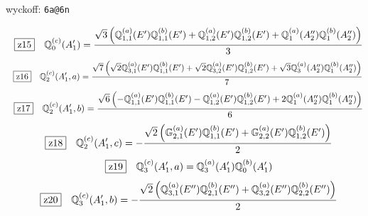 \documentclass[fleqn,10pt,landscape]{jsarticle}
\begin{document}
\noindent\quad * wyckoff: \texttt{6a@6n}

\begin{dmath*}
\hspace*{3mm}\fbox{z15}\quad \mathbb{Q}_{0}^{(c)}(A_{1}^{\prime})=\frac{\sqrt{3} \left(\mathbb{Q}_{1,1}^{(a)}(E^{\prime}) \mathbb{Q}_{1,1}^{(b)}(E^{\prime}) + \mathbb{Q}_{1,2}^{(a)}(E^{\prime}) \mathbb{Q}_{1,2}^{(b)}(E^{\prime}) + \mathbb{Q}_{1}^{(a)}(A_{2}^{\prime\prime}) \mathbb{Q}_{1}^{(b)}(A_{2}^{\prime\prime})\right)}{3}
\end{dmath*}
\begin{dmath*}
\hspace*{3mm}\fbox{z16}\quad \mathbb{Q}_{2}^{(c)}(A_{1}^{\prime},a)=\frac{\sqrt{7} \left(\sqrt{2} \mathbb{Q}_{3,1}^{(a)}(E^{\prime}) \mathbb{Q}_{1,1}^{(b)}(E^{\prime}) + \sqrt{2} \mathbb{Q}_{3,2}^{(a)}(E^{\prime}) \mathbb{Q}_{1,2}^{(b)}(E^{\prime}) + \sqrt{3} \mathbb{Q}_{3}^{(a)}(A_{2}^{\prime\prime}) \mathbb{Q}_{1}^{(b)}(A_{2}^{\prime\prime})\right)}{7}
\end{dmath*}
\begin{dmath*}
\hspace*{3mm}\fbox{z17}\quad \mathbb{Q}_{2}^{(c)}(A_{1}^{\prime},b)=\frac{\sqrt{6} \left(- \mathbb{Q}_{1,1}^{(a)}(E^{\prime}) \mathbb{Q}_{1,1}^{(b)}(E^{\prime}) - \mathbb{Q}_{1,2}^{(a)}(E^{\prime}) \mathbb{Q}_{1,2}^{(b)}(E^{\prime}) + 2 \mathbb{Q}_{1}^{(a)}(A_{2}^{\prime\prime}) \mathbb{Q}_{1}^{(b)}(A_{2}^{\prime\prime})\right)}{6}
\end{dmath*}
\begin{dmath*}
\hspace*{3mm}\fbox{z18}\quad \mathbb{Q}_{2}^{(c)}(A_{1}^{\prime},c)=- \frac{\sqrt{2} \left(\mathbb{G}_{2,1}^{(a)}(E^{\prime}) \mathbb{Q}_{1,1}^{(b)}(E^{\prime}) + \mathbb{G}_{2,2}^{(a)}(E^{\prime}) \mathbb{Q}_{1,2}^{(b)}(E^{\prime})\right)}{2}
\end{dmath*}
\begin{dmath*}
\hspace*{3mm}\fbox{z19}\quad \mathbb{Q}_{3}^{(c)}(A_{1}^{\prime},a)=\mathbb{Q}_{3}^{(a)}(A_{1}^{\prime}) \mathbb{Q}_{0}^{(b)}(A_{1}^{\prime})
\end{dmath*}
\begin{dmath*}
\hspace*{3mm}\fbox{z20}\quad \mathbb{Q}_{3}^{(c)}(A_{1}^{\prime},b)=- \frac{\sqrt{2} \left(\mathbb{Q}_{3,1}^{(a)}(E^{\prime\prime}) \mathbb{Q}_{2,1}^{(b)}(E^{\prime\prime}) + \mathbb{Q}_{3,2}^{(a)}(E^{\prime\prime}) \mathbb{Q}_{2,2}^{(b)}(E^{\prime\prime})\right)}{2}
\end{dmath*}
\end{document}
